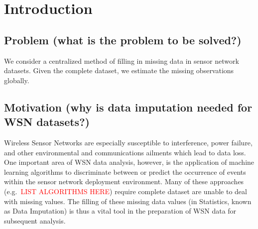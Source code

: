 \documentclass[10pt]{sensys11}
\begin{document}

\section{Introduction}

\subsection{Problem (what is the problem to be solved?)}
We consider a centralized method of filling in missing data in sensor network datasets.
Given the complete dataset, we estimate the missing observations globally.


\subsection{Motivation (why is data imputation needed for WSN datasets?)}
Wireless Sensor Networks are especially susceptible to interference, power failure, and other environmental and communications ailments which lead to data loss.
One important area of WSN data analysis, however, is the application of machine learning algorithms to discriminate between or predict the occurrence of events within the sensor network deployment environment.
Many of these approaches (e.g.\ \textcolor{red}{LIST ALGORITHMS HERE}) require complete dataset are unable to deal with missing values. The filling of these missing data values (in Statistics, known as Data Imputation) is thus a vital tool in the preparation of WSN data for subsequent analysis. 
\end{document}
